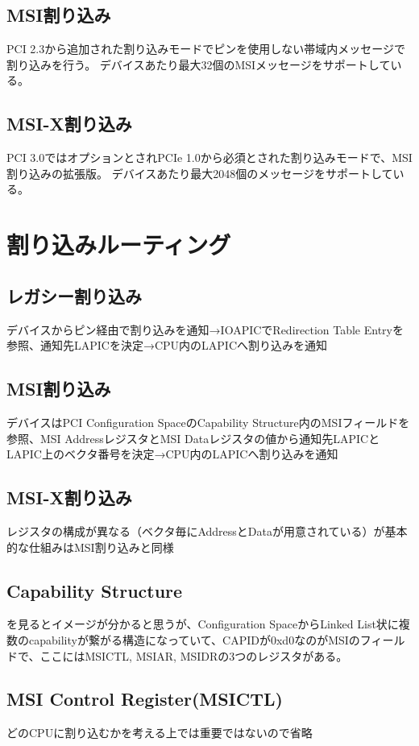 \subsection{MSI割り込み}
PCI 2.3から追加された割り込みモードでピンを使用しない帯域内メッセージで割り込みを行う。
デバイスあたり最大32個のMSIメッセージをサポートしている。

\subsection{MSI-X割り込み}
PCI 3.0ではオプションとされPCIe 1.0から必須とされた割り込みモードで、MSI割り込みの拡張版。
デバイスあたり最大2048個のメッセージをサポートしている。

\section{割り込みルーティング}
\subsection{レガシー割り込み}
デバイスからピン経由で割り込みを通知→IOAPICでRedirection Table Entryを参照、通知先LAPICを決定→CPU内のLAPICへ割り込みを通知

\subsection{MSI割り込み}
デバイスはPCI Configuration SpaceのCapability Structure内のMSIフィールドを参照、MSI AddressレジスタとMSI Dataレジスタの値から通知先LAPICとLAPIC上のベクタ番号を決定→CPU内のLAPICへ割り込みを通知

\subsection{MSI-X割り込み}
レジスタの構成が異なる（ベクタ毎にAddressとDataが用意されている）が基本的な仕組みはMSI割り込みと同様

\subsection{Capability Structure}
\cite{BIOSInit}を見るとイメージが分かると思うが、Configuration SpaceからLinked List状に複数のcapabilityが繋がる構造になっていて、CAPIDが0xd0なのがMSIのフィールドで、ここにはMSICTL, MSIAR, MSIDRの3つのレジスタがある。

\subsection{MSI Control Register(MSICTL)}
どのCPUに割り込むかを考える上では重要ではないので省略

